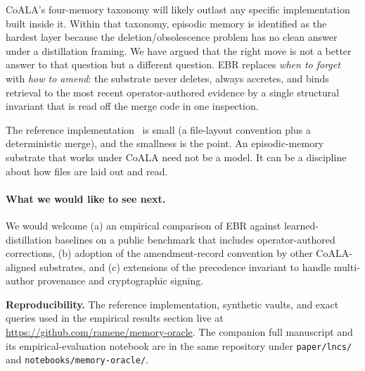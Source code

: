 \documentclass[11pt,a4paper]{article}
\begin{document}
\noindent
CoALA's four-memory taxonomy will likely outlast any specific implementation built
inside it. Within that taxonomy, episodic memory is identified as the hardest layer
because the deletion/obsolescence problem has no clean answer under a distillation
framing. We have argued that the right move is not a better answer to that question
but a different question. EBR replaces \emph{when to forget} with \emph{how to amend}:
the substrate never deletes, always accretes, and binds retrieval to the most recent
operator-authored evidence by a single structural invariant that is read off the merge
code in one inspection.

The reference implementation~\cite{anthony2026ebr} is small (a file-layout convention
plus a deterministic merge), and the smallness is the point. An episodic-memory
substrate that works under CoALA need not be a model. It can be a discipline about how
files are laid out and read.

\paragraph{What we would like to see next.}
We would welcome (a) an empirical comparison of EBR against learned-distillation
baselines on a public benchmark that includes operator-authored corrections, (b)
adoption of the amendment-record convention by other CoALA-aligned substrates, and (c)
extensions of the precedence invariant to handle multi-author provenance and
cryptographic signing.

\bigskip
\noindent
\textbf{Reproducibility.} The reference implementation, synthetic vaults, and exact
queries used in the empirical results section live at
\url{https://github.com/ramene/memory-oracle}. The companion full manuscript and its
empirical-evaluation notebook are in the same repository under \texttt{paper/lncs/} and
\texttt{notebooks/memory-oracle/}.



\end{document}
